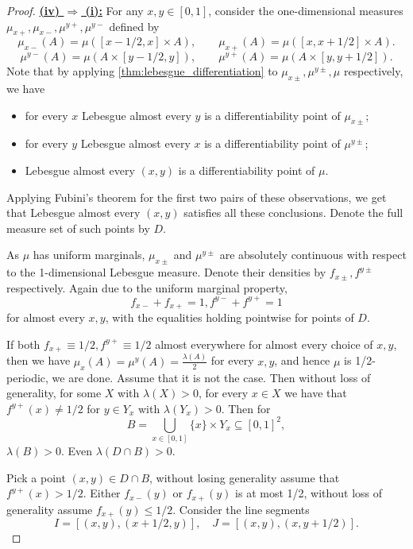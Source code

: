 \documentclass{article}
\theoremstyle{definition}
\begin{document}
\begin{proof}
    \underline{\bf (iv) $\Rightarrow$ (i):}
    For any $x, y\in [0, 1]$, consider the one-dimensional measures $\mu_{x+}, \mu_{x-}, \mu^{y+}, \mu^{y-}$ defined by
    $$\mu_{x-}(A)=\mu([x-1/2, x]\times A), \qquad \mu_{x+}(A)=\mu([x, x+1/2]\times A).$$
    $$\mu^{y-}(A)=\mu(A\times [y-1/2, y]), \qquad \mu^{y+}(A)=\mu(A\times [y, y+1/2]).$$
    Note that by applying \cref{thm:lebesgue_differentiation} to $\mu_{x\pm}, \mu^{y\pm}, \mu$ respectively, we have
    \begin{itemize}
        \item for every $x$ Lebesgue almost every $y$ is a differentiability point of $\mu_{x\pm}$;%
        \item for every $y$ Lebesgue almost every $x$ is a differentiability point of $\mu^{y\pm}$;%
        \item Lebesgue almost every $(x, y)$ is a differentiability point of $\mu$. %
    \end{itemize}
    Applying Fubini's theorem for the first two pairs of these observations, we get that Lebesgue almost every $(x, y)$ satisfies all these conclusions. Denote the full measure set of such points by $D$.
    
    As $\mu$ has uniform marginals, $\mu_{x\pm}$ and $\mu^{y\pm}$ are absolutely continuous with respect to the 1-dimensional Lebesgue measure. Denote their densities by $f_{x\pm}, f^{y\pm}$ respectively. Again due to the uniform marginal property,
    $$f_{x-}+f_{x+}=1, f^{y-}+f^{y+}=1 $$
    for almost every $x, y$, with the equalities holding pointwise for points of $D$.
    
    If both $f_{x+}\equiv1/2, f^{y+}\equiv 1/2$ almost everywhere for almost every choice of $x, y$, then we have $\mu_x(A)=\mu^{y}(A)=\frac{\lambda(A)}{2}$ for every $x, y$, and hence $\mu$ is 1/2-periodic, we are done. Assume that it is not the case. Then without loss of generality, for some $X$ with $\lambda(X)>0$, for every $x\in X$ we have that $f^{y+}(x)\neq 1/2$ for $y\in Y_x$ with $\lambda(Y_x)>0$. 
    Then for $$B=\bigcup_{x\in[0,1]} \{x\}\times Y_{x}\subseteq [0, 1]^2,$$
    $\lambda(B)>0$. Even $\lambda(D\cap B)>0$.

    Pick a point $(x, y)\in D\cap B$, without losing generality assume that $f^{y+}(x)>1/2$. Either $f_{x-}(y)$ or $f_{x+}(y)$ is at most 1/2, without loss of generality assume $f_{x+}(y)\leq 1/2$. Consider the line segments
    $$I=[(x, y), (x+1/2, y)], \quad J=[(x, y), (x, y+1/2)].$$
    

\end{proof}
\end{document}
